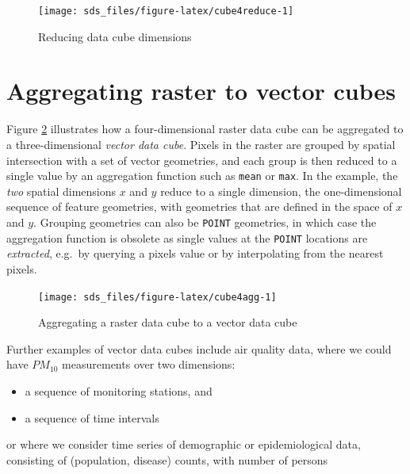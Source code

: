 \documentclass[]{book}
\providecommand{\tightlist}{%
  \setlength{\itemsep}{0pt}\setlength{\parskip}{0pt}}
\begin{document}
\begin{figure}

{\centering \texttt{[image: sds\_files/figure-latex/cube4reduce-1]} 

}

\caption{Reducing data cube dimensions}\label{fig:cube4reduce}
\end{figure}

\hypertarget{vectordatacubes}{%
\section{Aggregating raster to vector cubes}\label{vectordatacubes}}

Figure \ref{fig:cube4agg} illustrates how a four-dimensional raster
data cube can be aggregated to a three-dimensional \emph{vector data
cube}. Pixels in the raster are grouped by spatial intersection
with a set of vector geometries, and each group is then reduced
to a single value by an aggregation function such as \texttt{mean} or
\texttt{max}. In the example, the \emph{two} spatial dimensions \(x\) and \(y\)
reduce to a single dimension, the one-dimensional sequence of feature
geometries, with geometries that are defined in the space of \(x\)
and \(y\). Grouping geometries can also be \texttt{POINT} geometries, in
which case the aggregation function is obsolete as single values
at the \texttt{POINT} locations are \emph{extracted}, e.g.~by querying a pixels
value or by interpolating from the nearest pixels.

\begin{figure}

{\centering \texttt{[image: sds\_files/figure-latex/cube4agg-1]} 

}

\caption{Aggregating a raster data cube to a vector data cube}\label{fig:cube4agg}
\end{figure}

Further examples of vector data cubes include air quality data,
where we could have \(PM_{10}\) measurements over two dimensions:

\begin{itemize}
\tightlist
\item
  a sequence of monitoring stations, and
\item
  a sequence of time intervals
\end{itemize}

or where we consider time series of demographic or epidemiological
data, consisting of (population, disease) counts, with number
of persons
\end{document}
